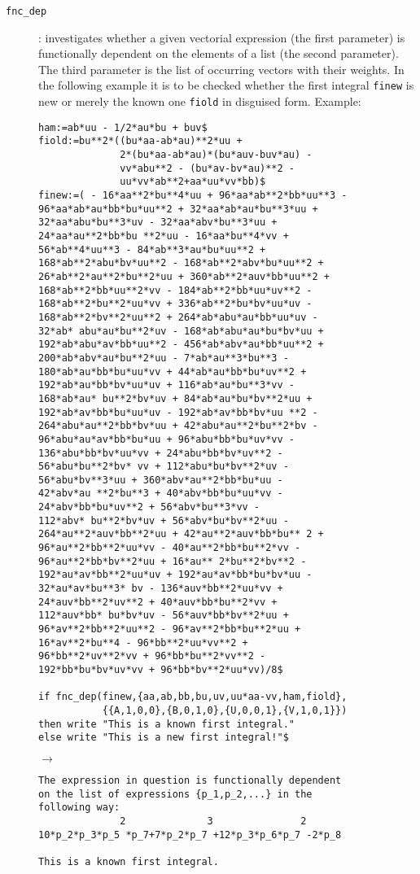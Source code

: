 \begin{description}
\item[\texttt{fnc\_dep}] : investigates whether a given vectorial
  expression (the first parameter) is functionally dependent on the
  elements of a list (the second parameter).  The third parameter is
  the list of occurring vectors with their weights.  In the following
  example it is to be checked whether the first integral
  \texttt{finew} is new or merely the known one \texttt{fiold} in
  disguised form.  Example:
{\small\begin{verbatim}
ham:=ab*uu - 1/2*au*bu + buv$
fiold:=bu**2*((bu*aa-ab*au)**2*uu +
              2*(bu*aa-ab*au)*(bu*auv-buv*au) -
              vv*abu**2 - (bu*av-bv*au)**2 -
              uu*vv*ab**2+aa*uu*vv*bb)$
finew:=( - 16*aa**2*bu**4*uu + 96*aa*ab**2*bb*uu**3 -
96*aa*ab*au*bb*bu*uu**2 + 32*aa*ab*au*bu**3*uu +
32*aa*abu*bu**3*uv - 32*aa*abv*bu**3*uu +
24*aa*au**2*bb*bu **2*uu - 16*aa*bu**4*vv +
56*ab**4*uu**3 - 84*ab**3*au*bu*uu**2 +
168*ab**2*abu*bv*uu**2 - 168*ab**2*abv*bu*uu**2 +
26*ab**2*au**2*bu**2*uu + 360*ab**2*auv*bb*uu**2 +
168*ab**2*bb*uu**2*vv - 184*ab**2*bb*uu*uv**2 -
168*ab**2*bu**2*uu*vv + 336*ab**2*bu*bv*uu*uv -
168*ab**2*bv**2*uu**2 + 264*ab*abu*au*bb*uu*uv -
32*ab* abu*au*bu**2*uv - 168*ab*abu*au*bu*bv*uu +
192*ab*abu*av*bb*uu**2 - 456*ab*abv*au*bb*uu**2 +
200*ab*abv*au*bu**2*uu - 7*ab*au**3*bu**3 -
180*ab*au*bb*bu*uu*vv + 44*ab*au*bb*bu*uv**2 +
192*ab*au*bb*bv*uu*uv + 116*ab*au*bu**3*vv -
168*ab*au* bu**2*bv*uv + 84*ab*au*bu*bv**2*uu +
192*ab*av*bb*bu*uu*uv - 192*ab*av*bb*bv*uu **2 -
264*abu*au**2*bb*bv*uu + 42*abu*au**2*bu**2*bv -
96*abu*au*av*bb*bu*uu + 96*abu*bb*bu*uv*vv -
136*abu*bb*bv*uu*vv + 24*abu*bb*bv*uv**2 -
56*abu*bu**2*bv* vv + 112*abu*bu*bv**2*uv -
56*abu*bv**3*uu + 360*abv*au**2*bb*bu*uu -
42*abv*au **2*bu**3 + 40*abv*bb*bu*uu*vv -
24*abv*bb*bu*uv**2 + 56*abv*bu**3*vv -
112*abv* bu**2*bv*uv + 56*abv*bu*bv**2*uu -
264*au**2*auv*bb**2*uu + 42*au**2*auv*bb*bu** 2 +
96*au**2*bb**2*uu*vv - 40*au**2*bb*bu**2*vv -
96*au**2*bb*bv**2*uu + 16*au** 2*bu**2*bv**2 -
192*au*av*bb**2*uu*uv + 192*au*av*bb*bu*bv*uu -
32*au*av*bu**3* bv - 136*auv*bb**2*uu*vv +
24*auv*bb**2*uv**2 + 40*auv*bb*bu**2*vv +
112*auv*bb* bu*bv*uv - 56*auv*bb*bv**2*uu +
96*av**2*bb**2*uu**2 - 96*av**2*bb*bu**2*uu +
16*av**2*bu**4 - 96*bb**2*uu*vv**2 +
96*bb**2*uv**2*vv + 96*bb*bu**2*vv**2 -
192*bb*bu*bv*uv*vv + 96*bb*bv**2*uu*vv)/8$

if fnc_dep(finew,{aa,ab,bb,bu,uv,uu*aa-vv,ham,fiold},
           {{A,1,0,0},{B,0,1,0},{U,0,0,1},{V,1,0,1}})
then write "This is a known first integral."
else write "This is a new first integral!"$
\end{verbatim}}
$\longrightarrow$
{\small\begin{verbatim}
The expression in question is functionally dependent
on the list of expressions {p_1,p_2,...} in the
following way:
              2              3               2
10*p_2*p_3*p_5 *p_7+7*p_2*p_7 +12*p_3*p_6*p_7 -2*p_8

This is a known first integral.
\end{verbatim}}
\end{description}

